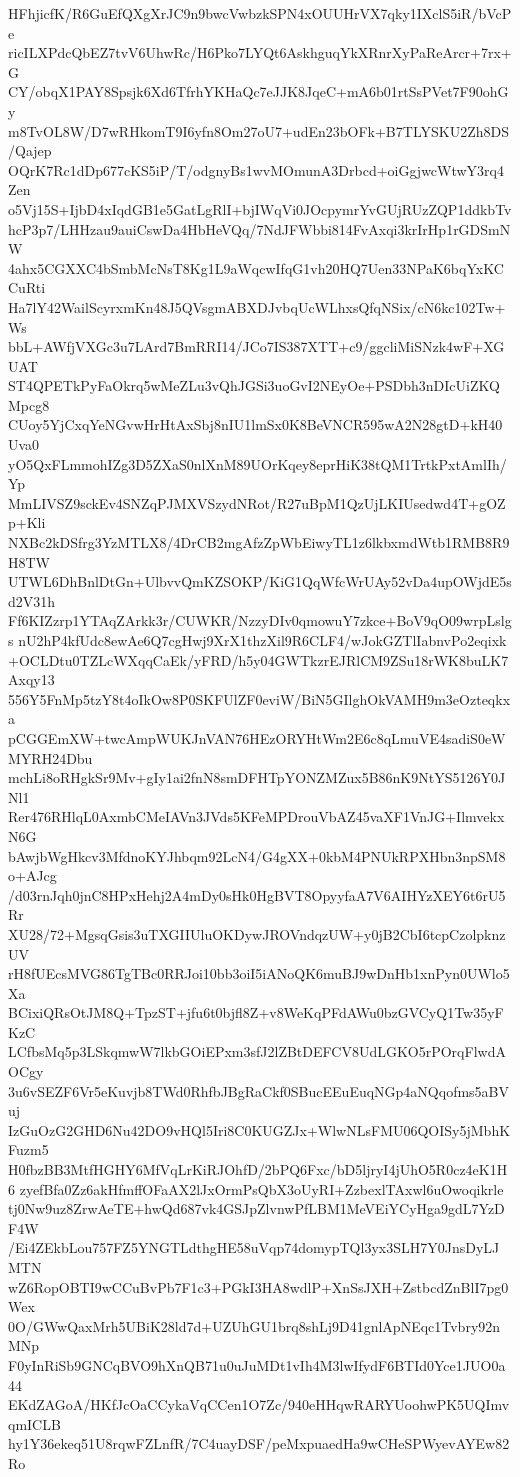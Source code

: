HFhjicfK/R6GuEfQXgXrJC9n9bwcVwbzkSPN4xOUUHrVX7qky1IXclS5iR/bVcPe
ricILXPdcQbEZ7tvV6UhwRc/H6Pko7LYQt6AskhguqYkXRnrXyPaReArcr+7rx+G
CY/obqX1PAY8Spsjk6Xd6TfrhYKHaQc7eJJK8JqeC+mA6b01rtSsPVet7F90ohGy
m8TvOL8W/D7wRHkomT9I6yfn8Om27oU7+udEn23bOFk+B7TLYSKU2Zh8DS/Qajep
OQrK7Rc1dDp677cKS5iP/T/odgnyBs1wvMOmunA3Drbcd+oiGgjwcWtwY3rq4Zen
o5Vj15S+IjbD4xIqdGB1e5GatLgRlI+bjIWqVi0JOcpymrYvGUjRUzZQP1ddkbTv
hcP3p7/LHHzau9auiCswDa4HbHeVQq/7NdJFWbbi814FvAxqi3krIrHp1rGDSmNW
4ahx5CGXXC4bSmbMcNsT8Kg1L9aWqcwIfqG1vh20HQ7Uen33NPaK6bqYxKCCuRti
Ha7lY42WailScyrxmKn48J5QVsgmABXDJvbqUcWLhxsQfqNSix/cN6kc102Tw+Ws
bbL+AWfjVXGc3u7LArd7BmRRI14/JCo7IS387XTT+c9/ggcliMiSNzk4wF+XGUAT
ST4QPETkPyFaOkrq5wMeZLu3vQhJGSi3uoGvI2NEyOe+PSDbh3nDIcUiZKQMpcg8
CUoy5YjCxqYeNGvwHrHtAxSbj8nIU1lmSx0K8BeVNCR595wA2N28gtD+kH40Uva0
yO5QxFLmmohIZg3D5ZXaS0nlXnM89UOrKqey8eprHiK38tQM1TrtkPxtAmlIh/Yp
MmLIVSZ9sckEv4SNZqPJMXVSzydNRot/R27uBpM1QzUjLKIUsedwd4T+gOZp+Kli
NXBc2kDSfrg3YzMTLX8/4DrCB2mgAfzZpWbEiwyTL1z6lkbxmdWtb1RMB8R9H8TW
UTWL6DhBnlDtGn+UlbvvQmKZSOKP/KiG1QqWfcWrUAy52vDa4upOWjdE5sd2V31h
Ff6KIZzrp1YTAqZArkk3r/CUWKR/NzzyDIv0qmowuY7zkce+BoV9qO09wrpLslgs
nU2hP4kfUdc8ewAe6Q7cgHwj9XrX1thzXil9R6CLF4/wJokGZTlIabnvPo2eqixk
+OCLDtu0TZLcWXqqCaEk/yFRD/h5y04GWTkzrEJRlCM9ZSu18rWK8buLK7Axqy13
556Y5FnMp5tzY8t4oIkOw8P0SKFUlZF0eviW/BiN5GIlghOkVAMH9m3eOzteqkxa
pCGGEmXW+twcAmpWUKJnVAN76HEzORYHtWm2E6c8qLmuVE4sadiS0eWMYRH24Dbu
mchLi8oRHgkSr9Mv+gIy1ai2fnN8smDFHTpYONZMZux5B86nK9NtYS5126Y0JNl1
Rer476RHlqL0AxmbCMeIAVn3JVds5KFeMPDrouVbAZ45vaXF1VnJG+IlmvekxN6G
bAwjbWgHkcv3MfdnoKYJhbqm92LcN4/G4gXX+0kbM4PNUkRPXHbn3npSM8o+AJcg
/d03rnJqh0jnC8HPxHehj2A4mDy0sHk0HgBVT8OpyyfaA7V6AIHYzXEY6t6rU5Rr
XU28/72+MgsqGsis3uTXGIIUluOKDywJROVndqzUW+y0jB2CbI6tcpCzolpknzUV
rH8fUEcsMVG86TgTBc0RRJoi10bb3oiI5iANoQK6muBJ9wDnHb1xnPyn0UWlo5Xa
BCixiQRsOtJM8Q+TpzST+jfu6t0bjfl8Z+v8WeKqPFdAWu0bzGVCyQ1Tw35yFKzC
LCfbsMq5p3LSkqmwW7lkbGOiEPxm3sfJ2lZBtDEFCV8UdLGKO5rPOrqFlwdAOCgy
3u6vSEZF6Vr5eKuvjb8TWd0RhfbJBgRaCkf0SBucEEuEuqNGp4aNQqofms5aBVuj
IzGuOzG2GHD6Nu42DO9vHQl5Iri8C0KUGZJx+WlwNLsFMU06QOISy5jMbhKFuzm5
H0fbzBB3MtfHGHY6MfVqLrKiRJOhfD/2bPQ6Fxc/bD5ljryI4jUhO5R0cz4eK1H6
zyefBfa0Zz6akHfmffOFaAX2lJxOrmPsQbX3oUyRI+ZzbexlTAxwl6uOwoqikrle
tj0Nw9uz8ZrwAeTE+hwQd687vk4GSJpZlvnwPfLBM1MeVEiYCyHga9gdL7YzDF4W
/Ei4ZEkbLou757FZ5YNGTLdthgHE58uVqp74domypTQl3yx3SLH7Y0JnsDyLJMTN
wZ6RopOBTI9wCCuBvPb7F1c3+PGkI3HA8wdlP+XnSsJXH+ZstbcdZnBlI7pg0Wex
0O/GWwQaxMrh5UBiK28ld7d+UZUhGU1brq8shLj9D41gnlApNEqc1Tvbry92nMNp
F0yInRiSb9GNCqBVO9hXnQB71u0uJuMDt1vIh4M3lwIfydF6BTId0Yce1JUO0a44
EKdZAGoA/HKfJcOaCCykaVqCCen1O7Zc/940eHHqwRARYUoohwPK5UQImvqmICLB
hy1Y36ekeq51U8rqwFZLnfR/7C4uayDSF/peMxpuaedHa9wCHeSPWyevAYEw82Ro
